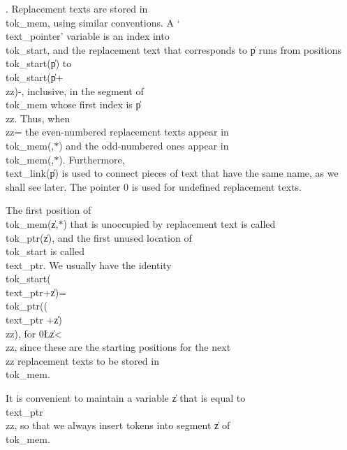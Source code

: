 . Replacement texts are stored in \\{tok\_mem}, using similar conventions.
A `\\{text\_pointer}' variable is an index into \\{tok\_start}, and the
replacement text that corresponds to \|p runs from positions
\\{tok\_start}\?(\?\|p\?)\? to \\{tok\_start}\?(\?\|p\?+\?\\{zz}\?)-,
inclusive, in the segment of
\\{tok\_mem} whose first index is \|p\?\?\\{zz}. Thus, when %
\\{zz}\?= the
even-numbered replacement texts appear in \\{tok\_mem}\?(\?,\?\hbox{$*$}\?)%
\? and the
odd-numbered ones appear in \\{tok\_mem}\?(\?,\?\hbox{$*$}\?)\?.
Furthermore,
\\{text\_link}\?(\?\|p\?)\? is used to connect pieces of text that have the
same name,
as we shall see later. The pointer 0 is used for undefined replacement
texts.

The first position of \\{tok\_mem}\?(\?\|z\?,\?\hbox{$*$}\?)\? that is
unoccupied by
replacement text is called \\{tok\_ptr}\?(\?\|z\?)\?, and the first unused
location of
\\{tok\_start} is called \\{text\_ptr}.  We usually have the identity
\\{tok\_start}\?(\?\\{text\_ptr}\?+\?\|z\?)=\?\\{tok\_ptr}\?((\?\\{text\_ptr}%
\?+\?\|z\?)\?\\{zz}\?)\?, for 0\?\L\?\|z\?<\?\\{zz}, since
these are the starting positions for the next \\{zz} replacement texts to
be stored in \\{tok\_mem}.

It is convenient to maintain a variable \|z that is equal to \\{text\_ptr}\?%
\?\\{zz}, so that we always insert tokens into segment \|z of %
\\{tok\_mem}.

